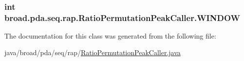 \hypertarget{classbroad_1_1pda_1_1seq_1_1rap_1_1_ratio_permutation_peak_caller_a41582385ffcdc555e23b6e0f7b6589d4}{
\subsubsection[{W\+I\+N\+D\+O\+W}]{\setlength{\rightskip}{0pt plus 5cm}int broad.\+pda.\+seq.\+rap.\+Ratio\+Permutation\+Peak\+Caller.\+W\+I\+N\+D\+O\+W}}\label{classbroad_1_1pda_1_1seq_1_1rap_1_1_ratio_permutation_peak_caller_a41582385ffcdc555e23b6e0f7b6589d4}


The documentation for this class was generated from the following file\+:\begin{DoxyCompactItemize}
\item 
java/broad/pda/seq/rap/\hyperlink{_ratio_permutation_peak_caller_8java}{Ratio\+Permutation\+Peak\+Caller.\+java}\end{DoxyCompactItemize}
